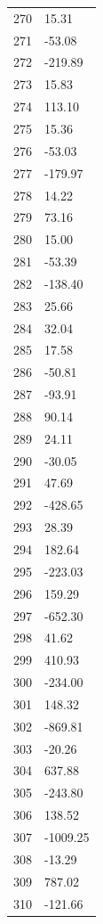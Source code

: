 \documentclass[a4paper,11pt]{article}
\begin{document}
\begin{center}
\begin{longtable}{|R{1.5cm}|R{2.5cm}|}
  270 &        15.31 \\
  271 &       -53.08 \\
  272 &      -219.89 \\
  273 &        15.83 \\
  274 &       113.10 \\
  275 &        15.36 \\
  276 &       -53.03 \\
  277 &      -179.97 \\
  278 &        14.22 \\
  279 &        73.16 \\
  280 &        15.00 \\
  281 &       -53.39 \\
  282 &      -138.40 \\
  283 &        25.66 \\
  284 &        32.04 \\
  285 &        17.58 \\
  286 &       -50.81 \\
  287 &       -93.91 \\
  288 &        90.14 \\
  289 &        24.11 \\
  290 &       -30.05 \\
  291 &        47.69 \\
  292 &      -428.65 \\
  293 &        28.39 \\
  294 &       182.64 \\
  295 &      -223.03 \\
  296 &       159.29 \\
  297 &      -652.30 \\
  298 &        41.62 \\
  299 &       410.93 \\
  300 &      -234.00 \\
  301 &       148.32 \\
  302 &      -869.81 \\
  303 &       -20.26 \\
  304 &       637.88 \\
  305 &      -243.80 \\
  306 &       138.52 \\
  307 &     -1009.25 \\
  308 &       -13.29 \\
  309 &       787.02 \\
  310 &      -121.66 \\

\end{longtable}
\end{center}
\end{document}
